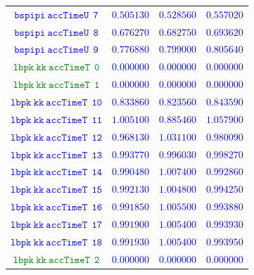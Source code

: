\documentclass[10pt,a4paper]{article}
\begin{document}
\begin{table}[h!]
{\begin{tabular}{cccc}
\textcolor{blue}{$\mathtt{bspipi~accTimeU~~7}$} & \textcolor{blue}{$0.505130$}& \textcolor{blue}{$0.528560$}& \textcolor{blue}{$0.557020$}\\
\textcolor{blue}{$\mathtt{bspipi~accTimeU~~8}$} & \textcolor{blue}{$0.676270$}& \textcolor{blue}{$0.682750$}& \textcolor{blue}{$0.693620$}\\
\textcolor{blue}{$\mathtt{bspipi~accTimeU~~9}$} & \textcolor{blue}{$0.776880$}& \textcolor{blue}{$0.799000$}& \textcolor{blue}{$0.805640$}\\
\textcolor{Green}{$\mathtt{lbpk~kk~accTimeT~~0}$} & \textcolor{blue}{$0.000000$}& \textcolor{blue}{$0.000000$}& \textcolor{blue}{$0.000000$}\\
\textcolor{Green}{$\mathtt{lbpk~kk~accTimeT~~1}$} & \textcolor{blue}{$0.000000$}& \textcolor{blue}{$0.000000$}& \textcolor{blue}{$0.000000$}\\
\textcolor{blue}{$\mathtt{lbpk~kk~accTimeT~~10}$} & \textcolor{blue}{$0.833860$}& \textcolor{blue}{$0.823560$}& \textcolor{blue}{$0.843590$}\\
\textcolor{blue}{$\mathtt{lbpk~kk~accTimeT~~11}$} & \textcolor{blue}{$1.005100$}& \textcolor{blue}{$0.885460$}& \textcolor{blue}{$1.057900$}\\
\textcolor{blue}{$\mathtt{lbpk~kk~accTimeT~~12}$} & \textcolor{blue}{$0.968130$}& \textcolor{blue}{$1.031100$}& \textcolor{blue}{$0.980090$}\\
\textcolor{blue}{$\mathtt{lbpk~kk~accTimeT~~13}$} & \textcolor{blue}{$0.993770$}& \textcolor{blue}{$0.996030$}& \textcolor{blue}{$0.998270$}\\
\textcolor{blue}{$\mathtt{lbpk~kk~accTimeT~~14}$} & \textcolor{blue}{$0.990480$}& \textcolor{blue}{$1.007400$}& \textcolor{blue}{$0.992860$}\\
\textcolor{blue}{$\mathtt{lbpk~kk~accTimeT~~15}$} & \textcolor{blue}{$0.992130$}& \textcolor{blue}{$1.004800$}& \textcolor{blue}{$0.994250$}\\
\textcolor{blue}{$\mathtt{lbpk~kk~accTimeT~~16}$} & \textcolor{blue}{$0.991850$}& \textcolor{blue}{$1.005500$}& \textcolor{blue}{$0.993880$}\\
\textcolor{blue}{$\mathtt{lbpk~kk~accTimeT~~17}$} & \textcolor{blue}{$0.991900$}& \textcolor{blue}{$1.005400$}& \textcolor{blue}{$0.993930$}\\
\textcolor{blue}{$\mathtt{lbpk~kk~accTimeT~~18}$} & \textcolor{blue}{$0.991930$}& \textcolor{blue}{$1.005400$}& \textcolor{blue}{$0.993950$}\\
\textcolor{Green}{$\mathtt{lbpk~kk~accTimeT~~2}$} & \textcolor{blue}{$0.000000$}& \textcolor{blue}{$0.000000$}& \textcolor{blue}{$0.000000$}\\

\end{tabular}}
\end{table}
\end{document}

